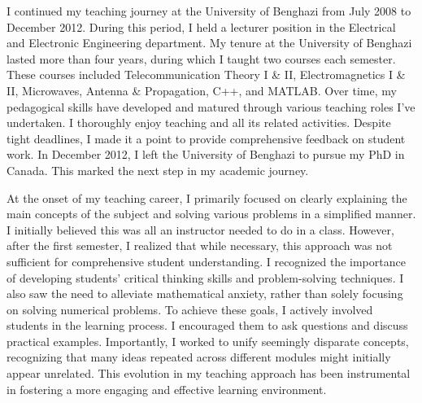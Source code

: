 \documentclass[11pt]{article}
\newcommand{\ignore}[1]{}
\begin{document}
I continued my teaching journey at the University of Benghazi from July 2008 to December 2012. During this period, I held a lecturer position in the Electrical and Electronic Engineering department. My tenure at the University of Benghazi lasted more than four years, during which I taught two courses each semester. These courses included Telecommunication Theory I \& II, Electromagnetics I \& II, Microwaves, Antenna \& Propagation, C++, and MATLAB.
Over time, my pedagogical skills have developed and matured through various teaching roles I've undertaken. I thoroughly enjoy teaching and all its related activities. Despite tight deadlines, I made it a point to provide comprehensive feedback on student work. 
In December 2012, I left the University of Benghazi to pursue my PhD in Canada. %
This marked the next step in my academic journey.








At the onset of my teaching career, I primarily focused on clearly explaining the main concepts of the subject and solving various problems in a simplified manner. I initially believed this was all an instructor needed to do in a class.
However, after the first semester, I realized that while necessary, this approach was not sufficient for comprehensive student understanding. I recognized the importance of developing students' critical thinking skills and problem-solving techniques. I also saw the need to alleviate mathematical anxiety, %
rather than solely focusing on solving numerical problems.
To achieve these goals, I actively involved students in the learning process. I encouraged them to ask questions and discuss  practical \ignore{, real-world} examples. Importantly, I worked to unify seemingly disparate concepts, recognizing that many ideas repeated across different modules might initially appear unrelated.
This evolution in my teaching approach has been instrumental in fostering a more engaging and effective learning environment.
\end{document}
